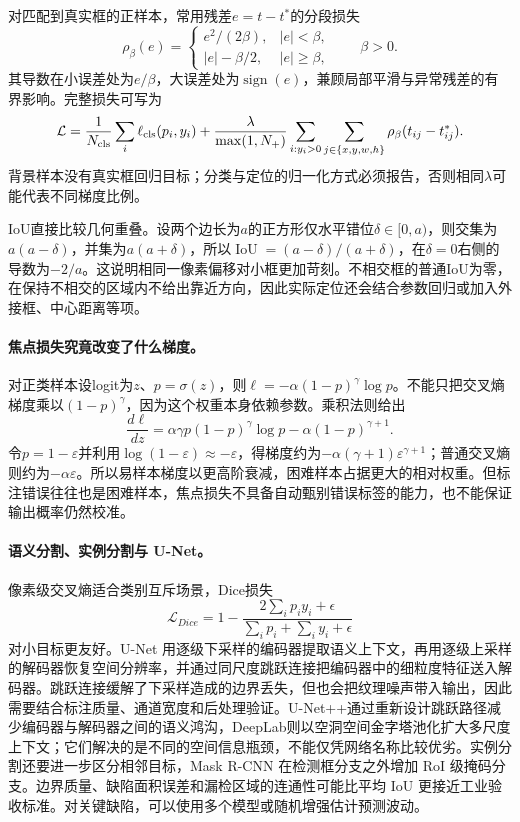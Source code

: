 对匹配到真实框的正样本，常用残差$e=t-t^*$的分段损失
\begin{equation}
 \rho_\beta(e)=\begin{cases}e^2/(2\beta),&|e|<\beta,\\|e|-\beta/2,&|e|\geq\beta,\end{cases}
 \qquad \beta>0.
\end{equation}
其导数在小误差处为$e/\beta$，大误差处为$\operatorname{sign}(e)$，兼顾局部平滑与异常残差的有界影响。完整损失可写为
\begin{equation}
 \mathcal L=\frac1{N_{\rm cls}}\sum_i\ell_{\rm cls}(p_i,y_i)
 +\frac{\lambda}{\max(1,N_+)}\sum_{i:y_i>0}\sum_{j\in\{x,y,w,h\}}\rho_\beta(t_{ij}-t_{ij}^*).
\end{equation}
背景样本没有真实框回归目标；分类与定位的归一化方式必须报告，否则相同$\lambda$可能代表不同梯度比例。

IoU直接比较几何重叠。设两个边长为$a$的正方形仅水平错位$\delta\in[0,a)$，则交集为$a(a-\delta)$，并集为$a(a+\delta)$，所以$\operatorname{IoU}=(a-\delta)/(a+\delta)$，在$\delta=0$右侧的导数为$-2/a$。这说明相同一像素偏移对小框更加苛刻。不相交框的普通IoU为零，在保持不相交的区域内不给出靠近方向，因此实际定位还会结合参数回归或加入外接框、中心距离等项。

\paragraph{焦点损失究竟改变了什么梯度。}
对正类样本设logit为$z$、$p=\sigma(z)$，则$\ell=-\alpha(1-p)^\gamma\log p$。不能只把交叉熵梯度乘以$(1-p)^\gamma$，因为这个权重本身依赖参数。乘积法则给出
\begin{equation}
 \frac{d\ell}{dz}=\alpha\gamma p(1-p)^\gamma\log p-\alpha(1-p)^{\gamma+1}.
\end{equation}
令$p=1-\varepsilon$并利用$\log(1-\varepsilon)\approx-\varepsilon$，得梯度约为$-\alpha(\gamma+1)\varepsilon^{\gamma+1}$；普通交叉熵则约为$-\alpha\varepsilon$。所以易样本梯度以更高阶衰减，困难样本占据更大的相对权重。但标注错误往往也是困难样本，焦点损失不具备自动甄别错误标签的能力，也不能保证输出概率仍然校准。

\paragraph{语义分割、实例分割与 U-Net。}
像素级交叉熵适合类别互斥场景，Dice损失
\begin{equation}
 \mathcal{L}_{Dice}=1-\frac{2\sum_i p_iy_i+\epsilon}{\sum_i p_i+\sum_i y_i+\epsilon}\label{eq:vision-soft-dice}
\end{equation}
对小目标更友好。U-Net 用逐级下采样的编码器提取语义上下文，再用逐级上采样的解码器恢复空间分辨率，并通过同尺度跳跃连接把编码器中的细粒度特征送入解码器。跳跃连接缓解了下采样造成的边界丢失，但也会把纹理噪声带入输出，因此需要结合标注质量、通道宽度和后处理验证。U-Net++通过重新设计跳跃路径减少编码器与解码器之间的语义鸿沟，DeepLab则以空洞空间金字塔池化扩大多尺度上下文；它们解决的是不同的空间信息瓶颈，不能仅凭网络名称比较优劣。实例分割还要进一步区分相邻目标，Mask R-CNN 在检测框分支之外增加 RoI 级掩码分支。边界质量、缺陷面积误差和漏检区域的连通性可能比平均 IoU 更接近工业验收标准。对关键缺陷，可以使用多个模型或随机增强估计预测波动。

